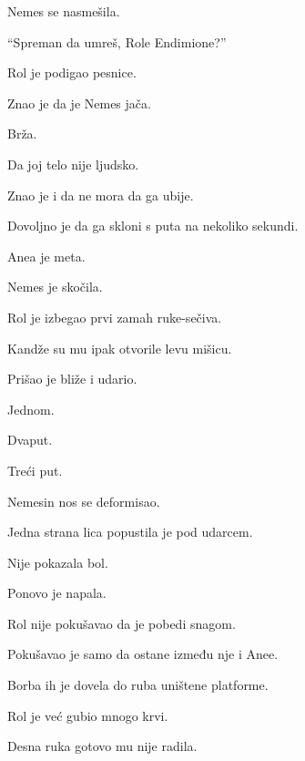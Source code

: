 \bigskip

Nemes se nasmešila.

\bigskip

``Spreman da umreš, Role Endimione?''

\bigskip

Rol je podigao pesnice.

\bigskip

Znao je da je Nemes jača.

Brža.

Da joj telo nije ljudsko.

\bigskip

Znao je i da ne mora da ga ubije.

\bigskip

Dovoljno je da ga skloni s puta na nekoliko sekundi.

\bigskip

Anea je meta.

\bigskip

Nemes je skočila.

\bigskip

Rol je izbegao prvi zamah ruke-sečiva.

Kandže su mu ipak otvorile levu mišicu.

\bigskip

Prišao je bliže i udario.

\bigskip

Jednom.

Dvaput.

Treći put.

\bigskip

Nemesin nos se deformisao.

Jedna strana lica popustila je pod udarcem.

\bigskip

Nije pokazala bol.

\bigskip

Ponovo je napala.

\bigskip

Rol nije pokušavao da je pobedi snagom.

\bigskip

Pokušavao je samo da ostane između nje i Anee.

\bigskip

Borba ih je dovela do ruba uništene platforme.

\bigskip

Rol je već gubio mnogo krvi.

Desna ruka gotovo mu nije radila.

